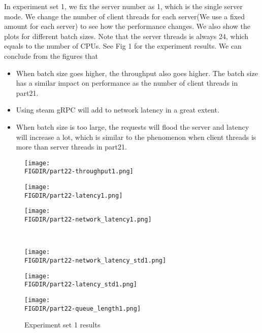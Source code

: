 \documentclass{article}
\begin{document}
\begin{spacing}{1.1}
In experiment set 1, we fix the server number as 1, which is the single server mode. We change the number of client threads for each server(We use a fixed amount for each server) to see how the performance changes. We also show the plots for different batch sizes. Note that the server threads is always 24, which equals to the number of CPUs. See Fig 1 for the experiment results. We can conclude from the figures that 
\begin{itemize}
    \setlength\itemsep{1pt}
    \item When batch size goes higher, the throughput also goes higher. The batch size has a similar impact on performance as the number of client threads in part21. 
    \item Using steam gRPC will add to network latency in a great extent. 
    \item When batch size is too large, the requests will flood the server and latency will increase a lot, which is similar to the phenomenon when client threads is more than server threads in part21.
\end{itemize}

\begin{figure}[htbp]
    \centering
    \begin{minipage}{0.32\linewidth}
        \centering
	\texttt{[image: \\FIGDIR/part22-throughput1.png]}
	\label{throuput1}
    \end{minipage}
    \begin{minipage}{0.32\linewidth}
        \centering
        \texttt{[image: \\FIGDIR/part22-latency1.png]}
        \label{latency1}
    \end{minipage}
    \begin{minipage}{0.32\linewidth}
        \centering
        \texttt{[image: \\FIGDIR/part22-network\_latency1.png]}
        \label{network-latency1}
    \end{minipage} \\
    \begin{minipage}{0.32\linewidth}
        \centering
        \texttt{[image: \\FIGDIR/part22-network\_latency\_std1.png]}
        \label{queue-latency1}
    \end{minipage}
    \begin{minipage}{0.32\linewidth}
        \centering
        \texttt{[image: \\FIGDIR/part22-latency\_std1.png]}
        \label{latency-std1}
    \end{minipage}
    \begin{minipage}{0.32\linewidth}
        \centering
        \texttt{[image: \\FIGDIR/part22-queue\_length1.png]}
        \label{queue-length1}
    \end{minipage}
    \label{experiment1}
    \caption{Experiment set 1 results}
\end{figure}


\end{spacing}
\end{document}
